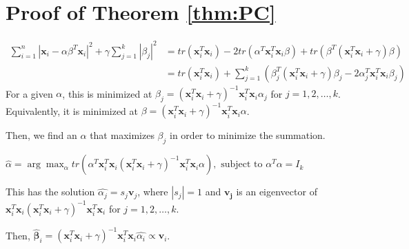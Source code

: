 \documentclass{article}
\begin{document}
\appendix
\section{Proof of Theorem \eqref{thm:PC}}
\begin{align*}
\sum_{i=1}^n |\boldsymbol{x}_i-\alpha \beta^T \boldsymbol{x}_i|^2 + \gamma \sum_{j=1}^k |\beta_j|^2 &= tr(\boldsymbol{x}_i^T\boldsymbol{x}_i) - 2 tr(\alpha^T\boldsymbol{x}_i^T\boldsymbol{x}_i\beta) +tr(\beta^T(\boldsymbol{x}_i^T\boldsymbol{x}_i+\gamma)\beta)\\
&=tr(\boldsymbol{x}_i^T\boldsymbol{x}_i)+\sum_{j=1}^k(\beta_j^T(\boldsymbol{x}_i^T\boldsymbol{x}_i+\gamma)\beta_j-2\alpha_j^T\boldsymbol{x}_i^T\boldsymbol{x}_i\beta_j)
\end{align*}
For a given $\alpha$, this is minimized at $\beta_j=(\boldsymbol{x}_i^T\boldsymbol{x}_i+\gamma)^{-1}\boldsymbol{x}_i^T\boldsymbol{x}_i\alpha_j$ for $j=1, 2, \ldots, k$. Equivalently, it is minimized at $\beta = (\boldsymbol{x}_i^T\boldsymbol{x}_i+\gamma)^{-1}\boldsymbol{x}_i^T\boldsymbol{x}_i\alpha$.

Then, we find an $\alpha$ that maximizes $\beta_j$ in order to minimize the summation.

$\hat{\alpha}=\arg\max_{\alpha}tr(\alpha^T\boldsymbol{x}_i^T\boldsymbol{x}_i(\boldsymbol{x}_i^T\boldsymbol{x}_i+\gamma)^{-1}\boldsymbol{x}_i^T\boldsymbol{x}_i\alpha), \text{ subject to } \alpha^T\alpha=I_k$

This has the solution $\hat{\alpha_j}=s_j\boldsymbol{v}_j$, where $|s_j|=1$ and $\boldsymbol{v_j}$ is an eigenvector of $\boldsymbol{x}_i^T\boldsymbol{x}_i(\boldsymbol{x}_i^T\boldsymbol{x}_i+\gamma)^{-1}\boldsymbol{x}_i^T\boldsymbol{x}_i$ for $j=1, 2, \ldots, k$.

Then, $\boldsymbol{\hat{\beta}}_i=(\boldsymbol{x}_i^T\boldsymbol{x}_i+\gamma)^{-1}\boldsymbol{x}_i^T\boldsymbol{x}_i\hat{\alpha_i}\propto \boldsymbol{v}_i$.


%
%
\end{document}
